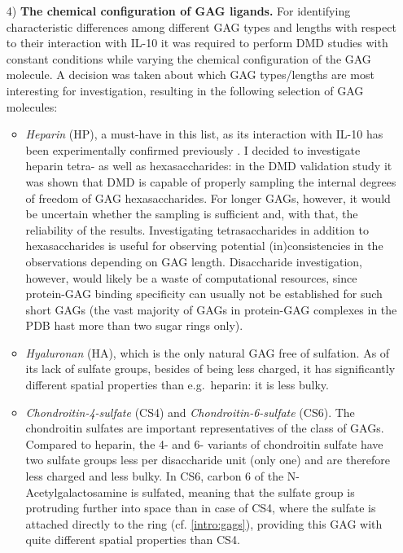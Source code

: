 \begin{itemize}


\item[4)] \textbf{The chemical configuration of GAG ligands.} For identifying
characteristic differences among different GAG types and lengths with respect to
their interaction with IL-10 it was required to perform DMD studies with
constant conditions while varying the chemical configuration of the GAG
molecule. A decision was taken about which GAG types/lengths are most
interesting for investigation, resulting in the following selection of GAG
molecules:

\begin{itemize}

\item \textit{Heparin} (HP), a must-have in this list, as its interaction with
IL-10 has been experimentally confirmed previously \cite{salek_ardakani_2000}. I
decided to investigate heparin tetra- as well as hexasaccharides: in the DMD
validation study it was shown that DMD is capable of properly sampling the
internal degrees of freedom of GAG hexasaccharides. For longer GAGs, however, it
would be uncertain whether the sampling is sufficient and, with that, the
reliability of the results. Investigating tetrasaccharides in addition to
hexasaccharides is useful for observing potential (in)consistencies in the
observations depending on GAG length. Disaccharide investigation, however, would
likely be a waste of computational resources, since protein-GAG binding
specificity can usually not be established for such short GAGs (the vast
majority of GAGs in protein-GAG complexes in the PDB hast more than two sugar
rings only).

\item \textit{Hyaluronan} (HA), which is the only natural GAG free of sulfation.
As of its lack of sulfate groups, besides of being less charged, it has
significantly different spatial properties than e.g.\ heparin: it is less bulky.

\item \textit{Chondroitin-4-sulfate} (CS4) and \textit{Chondroitin-6-sulfate}
(CS6). The chondroitin sulfates are important representatives of the class of
GAGs. Compared to heparin, the 4- and 6- variants of chondroitin sulfate have
two sulfate groups less per disaccharide unit (only one) and are therefore less
charged and less bulky. In CS6, carbon 6 of the N-Acetyl\-ga\-lacto\-sa\-mine is
sulfated, meaning that the sulfate group is protruding further into space than
in case of CS4, where the sulfate is attached directly to the ring (cf.
\cref{intro:gags}), providing this GAG with quite different spatial properties
than CS4.

\end{itemize}

\end{itemize}

